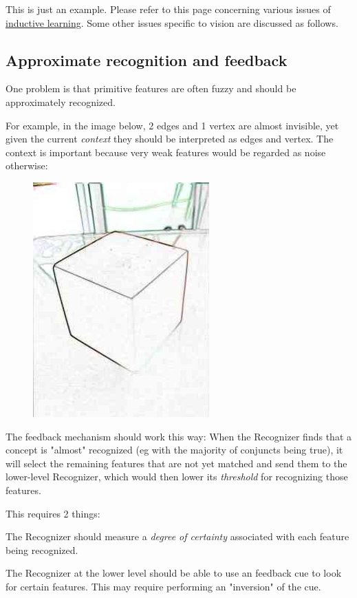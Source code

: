 This is just an example. Please refer to this page concerning  various issues of \href{Vis-InductiveLearning.htm}{inductive learning}. Some other issues specific to vision are discussed as follows.

\subsection{Approximate recognition and feedback}

One problem is that primitive features  are often fuzzy and should be approximately recognized.

For example, in the image below, 2 edges and 1 vertex are almost invisible, yet given the current \emph{context} they should be interpreted as edges and vertex. The context is important because very weak features would be regarded as noise otherwise:

\begin{figure}[H]
\centering
\includegraphics[scale=0.8]{CubeMissingEdge.png}
\end{figure}

The feedback mechanism should work this way: When the Recognizer finds that a concept is "almost" recognized (eg with the majority of conjuncts being true), it will select the remaining features that are not yet matched and send them to the lower-level Recognizer, which would then lower its \emph{threshold} for recognizing those features.

This requires 2 things:
\begin{compactenum-}
	\item The Recognizer  should measure a \emph{degree of certainty} associated with each feature being recognized.
	\item  The Recognizer  at the lower level should be able to use an feedback cue to look for certain features. This may require performing an "inversion" of the cue.
\end{compactenum-}

